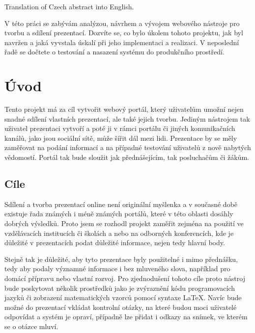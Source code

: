 \documentclass[11pt,twoside,a4paper]{book}
\begin{document}
	Translation of Czech abstract into English.


	\baselineskip

	\noindent
	V této práci se zabývám analýzou, návrhem a vývojem webového nástroje pro tvorbu a sdílení prezentací. Dozvíte se, co bylo úkolem tohoto projektu, jak byl navržen a jaká vyvstala úskalí při jeho implementaci a realizaci. V neposlední řadě se dočtete o testování a nasazení systému do produkčního prostředí.

	\tableofcontents		%

	\listoffigures			%

	\mainbodystarts



\chapter{Úvod}
Tento projekt má za cíl vytvořit webový portál, který uživatelům umožní nejen snadné sdílení vlastních prezentací, ale také jejich tvorbu. Jediným nástrojem tak uživatel prezentaci vytvoří a poté ji v rámci portálu či jiných komunikačních kanálů, jako jsou sociální sítě, může šířit dál mezi lidi. Prezentace by se měly zaměřovat na podání informací a na případné testování uživatelů z nově nabytých vědomostí. Portál tak bude sloužit jak přednášejícím, tak posluchačům či žákům.

\section{Cíle}
Sdílení a tvorba prezentací online není originální myšlenka a v současné době existuje řada známých i méně známých portálů, které v této oblasti dosáhly dobrých výsledků. Proto jsem se rozhodl projekt zaměřit zejména na použití ve vzdělávacích institucích či školách a nebo na odborných konferencích, kde je důležité v prezentacích podat důležité informace, nejen tedy hlavní body.

Stejně tak je důležité, aby tyto prezentace byly použitelné i mimo přednášku, tedy aby podaly významné informace i bez mluveného slova, například pro domácí přípravu nebo vlastní rozvoj. Pro zjednodušení tohoto cíle proto nástroj bude poskytovat několik prostředků jako je zvýraznění kódu programovacích jazyků či zobrazení matematických vzorců pomocí syntaxe \LaTeX. Navíc bude možné do prezentací vkládat kontrolní otázky, na které budou moci uživatelé odpovídat a systém je opraví, případně lze přidat i odkazy na snímek, ve kterém se o otázce mluví.
\end{document}
